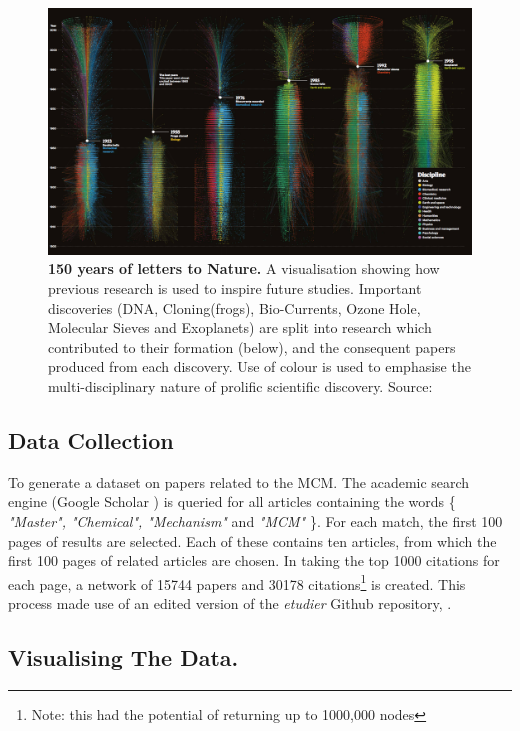 \begin{figure}[H]
     \centering
         \includegraphics[width=0.92\textheight,angle=90]{figures_c3/naturegraph.png}

        \caption{\textbf{150 years of letters to Nature.} A visualisation showing how previous research is used to inspire future studies. Important discoveries (DNA, Cloning(frogs), Bio-Currents, Ozone Hole, Molecular Sieves and Exoplanets) are split into research which contributed to their formation (below), and the consequent papers produced from each discovery. Use of colour is used to emphasise the multi-disciplinary nature of prolific scientific discovery. Source: \citep{naturecover}}
        \label{fig:naturecover}
\end{figure}



\subsection{Data Collection}\label{sec:scholar}

To generate a dataset on papers related to the MCM. The academic search engine (Google Scholar \citep{scholar}) is queried for all articles containing the words \{ \emph{"Master", "Chemical", "Mechanism"} and \emph{"MCM"} \}. For each match, the first 100 pages of results are selected. Each of these contains ten articles, from which the first 100 pages of related articles are chosen.
In taking the top 1000 citations for each page, a network of 15744 papers and 30178 citations\footnote{Note: this had the potential of returning up to 1000,000 nodes} is created. This process made use of an edited version of the  \emph{etudier} Github repository, \citep{web}.


\subsection{Visualising The Data.}

